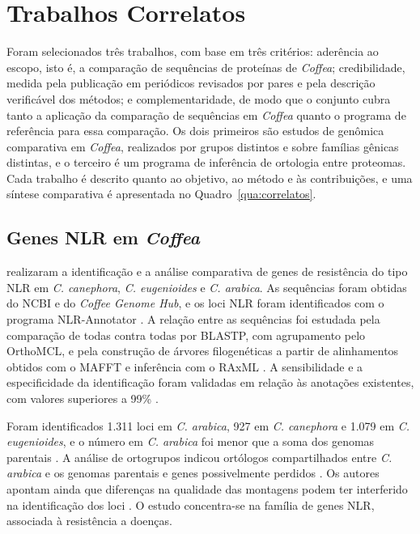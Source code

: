 \section{Trabalhos Correlatos}

Foram selecionados três trabalhos, com base em três critérios: aderência ao escopo, isto é, a comparação de sequências de proteínas de \textit{Coffea}; credibilidade, medida pela publicação em periódicos revisados por pares e pela descrição verificável dos métodos; e complementaridade, de modo que o conjunto cubra tanto a aplicação da comparação de sequências em \textit{Coffea} quanto o programa de referência para essa comparação. Os dois primeiros são estudos de genômica comparativa em \textit{Coffea}, realizados por grupos distintos e sobre famílias gênicas distintas, e o terceiro é um programa de inferência de ortologia entre proteomas. Cada trabalho é descrito quanto ao objetivo, ao método e às contribuições, e uma síntese comparativa é apresentada no Quadro~\ref{qua:correlatos}.

\subsection{Genes NLR em \textit{Coffea}}

 realizaram a identificação e a análise comparativa de genes de resistência do tipo NLR em \textit{C. canephora}, \textit{C. eugenioides} e \textit{C. arabica}. As sequências foram obtidas do NCBI e do \textit{Coffee Genome Hub}, e os loci NLR foram identificados com o programa NLR-Annotator \cite{Santos2022}. A relação entre as sequências foi estudada pela comparação de todas contra todas por BLASTP, com agrupamento pelo OrthoMCL, e pela construção de árvores filogenéticas a partir de alinhamentos obtidos com o MAFFT e inferência com o RAxML \cite{Santos2022}. A sensibilidade e a especificidade da identificação foram validadas em relação às anotações existentes, com valores superiores a 99\% \cite{Santos2022}.

Foram identificados 1.311 loci em \textit{C. arabica}, 927 em \textit{C. canephora} e 1.079 em \textit{C. eugenioides}, e o número em \textit{C. arabica} foi menor que a soma dos genomas parentais \cite{Santos2022}. A análise de ortogrupos indicou ortólogos compartilhados entre \textit{C. arabica} e os genomas parentais e genes possivelmente perdidos \cite{Santos2022}. Os autores apontam ainda que diferenças na qualidade das montagens podem ter interferido na identificação dos loci \cite{Santos2022}. O estudo concentra-se na família de genes NLR, associada à resistência a doenças.

